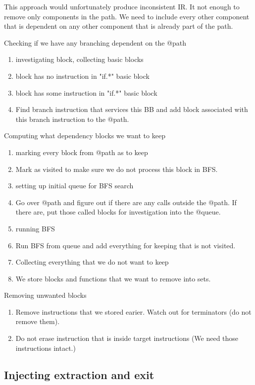 \documentclass[12pt, twoside]{fithesis2}
\renewcommand{\_}{\leavevmode \kern0.07em\vbox{\hrule width0.4em}}
\newenvironment{myEnumerate}{
  \begin{enumerate}[
    leftmargin=2em,
    rightmargin=1em,
    itemsep=\parskip,
    parsep=0em,
    topsep=0em,
    partopsep=0em
]
}{
  \end{enumerate}
}
\begin{document}
This approach would unfortunately produce inconsistent IR. It not enough to
remove only components in the path. We need to include every other component
that is dependent on any other component that is already part of the path.

Checking if we have any branching dependent on the @path
\begin{myEnumerate}
\item investigating block, collecting basic blocks
\item block has no instruction in "if.*" basic block
\item block has some instruction in "if.*" basic block
\item Find branch instruction that services this BB and add block associated with this branch instruction to the @path.
\end{myEnumerate}

Computing what dependency blocks we want to keep
\begin{myEnumerate}
\item marking every block from @path as to keep
\item Mark as visited to make sure we do not process this block in BFS.
\item setting up initial queue for BFS search
\item Go over @path and figure out if there are any calls outside the @path. If there
are, put those called blocks for investigation into the @queue.
\item running BFS
\item Run BFS from queue and add everything for keeping that is not visited.
\item Collecting everything that we do not want to keep
\item We store blocks and functions that we want to remove into sets.
\end{myEnumerate}

Removing unwanted blocks
\begin{myEnumerate}
\item Remove instructions that we stored earier. Watch out for terminators (do not
remove them).
\item Do not erase instruction that is inside target instructions (We need those
instructions intact.)
\end{myEnumerate}

\subsection{Injecting extraction and exit}
\end{document}
